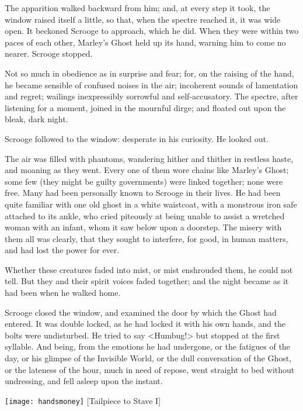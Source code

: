 The apparition walked backward from him; and, at every step it took, the window raised itself a little, so that, when the spectre reached it, it was wide open. It beckoned Scrooge to approach, which he did. When they were within two paces of each other, Marley's Ghost held up its hand, warning him to come no nearer. Scrooge stopped.

Not so much in obedience as in surprise and fear; for, on the raising of the hand, he became sensible of confused noises in the air; incoherent sounds of lamentation and regret; wailings inexpressibly sorrowful and self-accusatory. The spectre, after listening for a moment, joined in the mournful dirge; and floated out upon the bleak, dark night.

Scrooge followed to the window: desperate in his curiosity. He looked out.

The air was filled with phantoms, wandering hither and thither in restless haste, and moaning as they went. Every one of them wore chains like Marley's Ghost; some few (they might be guilty governments) were linked together; none were free. Many had been personally known to Scrooge in their lives. He had been quite familiar with one old ghost in a white waistcoat, with a monstrous iron safe attached to its ankle, who cried piteously at being unable to assist a wretched woman with an infant, whom it saw below upon a doorstep. The misery with them all was clearly, that they sought to interfere, for good, in human matters, and had lost the power for ever.

Whether these creatures faded into mist, or mist enshrouded them, he could not tell. But they and their spirit voices faded together; and the night became as it had been when he walked home.

Scrooge closed the window, and examined the door by which the Ghost had entered. It was double locked, as he had locked it with his own hands, and the bolts were undisturbed. He tried to say <Humbug!> but stopped at the first syllable. And being, from the emotions he had undergone, or the fatigues of the day, or his glimpse of the Invisible World, or the dull conversation of the Ghost, or the lateness of the hour, much in need of repose, went straight to bed without undressing, and fell asleep upon the instant.
\nopagebreak[4]
\vfill
\begin{center}
\texttt{[image: handsmoney]}
[Tailpiece to Stave I]{}
\end{center}

